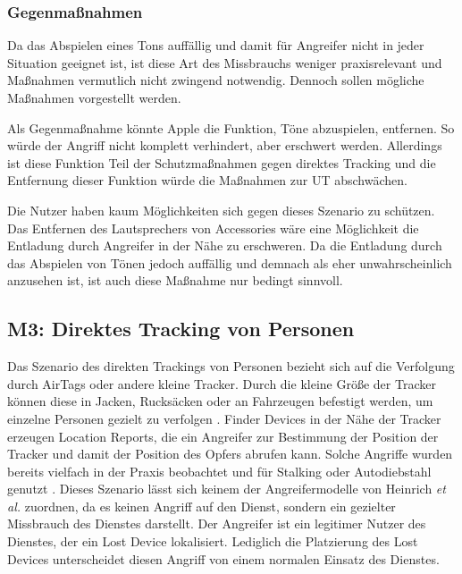 \subsubsection{Gegenmaßnahmen}
Da das Abspielen eines Tons auffällig und damit für Angreifer nicht in jeder Situation geeignet ist, ist diese Art des Missbrauchs weniger praxisrelevant und Maßnahmen vermutlich nicht zwingend notwendig.
Dennoch sollen mögliche Maßnahmen vorgestellt werden.

Als Gegenmaßnahme könnte Apple die Funktion, Töne abzuspielen, entfernen.
So würde der Angriff nicht komplett verhindert, aber erschwert werden.
Allerdings ist diese Funktion Teil der Schutzmaßnahmen gegen direktes Tracking und die Entfernung dieser Funktion würde die Maßnahmen zur \ac{UT} abschwächen.


Die Nutzer haben kaum Möglichkeiten sich gegen dieses Szenario zu schützen. 
Das Entfernen des Lautsprechers von Accessories wäre eine Möglichkeit die Entladung durch Angreifer in der Nähe zu erschweren.
Da die Entladung durch das Abspielen von Tönen jedoch auffällig und demnach als eher unwahrscheinlich anzusehen ist, ist auch diese Maßnahme nur bedingt sinnvoll.


\subsection[M3]{M3: Direktes Tracking von Personen}
\label{missbrauch:3}
Das Szenario des direkten Trackings von Personen bezieht sich auf die Verfolgung durch AirTags oder andere kleine Tracker.
Durch die kleine Größe der Tracker können diese in Jacken, Rucksäcken oder an Fahrzeugen befestigt werden, um einzelne Personen gezielt zu verfolgen \cite{Roth_airtags}.
Finder Devices in der Nähe der Tracker erzeugen Location Reports, die ein Angreifer zur Bestimmung der Position der Tracker und damit der Position des Opfers abrufen kann.
Solche Angriffe wurden bereits vielfach in der Praxis beobachtet und für Stalking oder Autodiebstahl genutzt \cite{NYT_Airtags}.
Dieses Szenario lässt sich keinem der Angreifermodelle von Heinrich \textit{et al.} \cite{Heinrich_FindMy} zuordnen, da es keinen Angriff auf den Dienst, sondern ein gezielter Missbrauch des Dienstes darstellt.
Der Angreifer ist ein legitimer Nutzer des Dienstes, der ein Lost Device lokalisiert.
Lediglich die Platzierung des Lost Devices unterscheidet diesen Angriff von einem normalen Einsatz des Dienstes.

